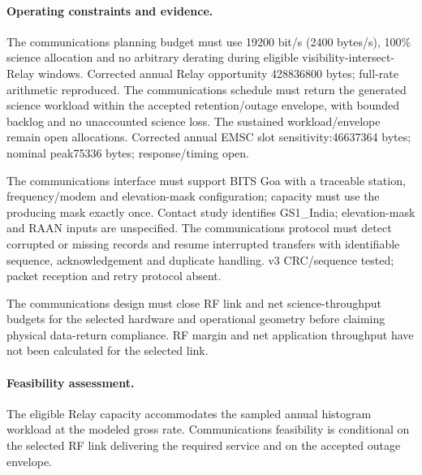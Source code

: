 \paragraph{Operating constraints and evidence.} 
The communications planning budget must use 19200 bit/s (2400 bytes/s), 100\% science allocation and no arbitrary derating during eligible visibility-intersect-Relay windows. Corrected annual Relay opportunity 428836800 bytes; full-rate arithmetic reproduced.
The communications schedule must return the generated science workload within the accepted retention/outage envelope, with bounded backlog and no unaccounted science loss. The sustained workload/envelope remain open allocations. Corrected annual EMSC slot sensitivity:46637364 bytes; nominal peak75336 bytes; response/timing open.

The communications interface must support BITS Goa with a traceable station, frequency/modem and elevation-mask configuration; capacity must use the producing mask exactly once. Contact study identifies GS1\_India; elevation-mask and RAAN inputs are unspecified.
The communications protocol must detect corrupted or missing records and resume interrupted transfers with identifiable sequence, acknowledgement and duplicate handling. v3 CRC/sequence tested; packet reception and retry protocol absent.

The communications design must close RF link and net science-throughput budgets for the selected hardware and operational geometry before claiming physical data-return compliance. RF margin and net application throughput have not been calculated for the selected link.

\paragraph{Feasibility assessment.} The eligible Relay capacity accommodates the sampled annual histogram workload at the modeled gross rate. Communications feasibility is conditional on the selected RF link delivering the required service and on the accepted outage envelope.
